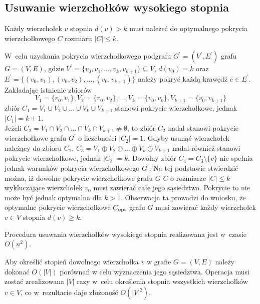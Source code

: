 \subsection{Usuwanie wierzchołków wysokiego stopnia}\label{section_kernelization_high-degree}

\begin{theorem}
  Każdy wierzchołek $v$ stopnia $d(v) > k$ musi należeć do optymalnego pokrycia wierzchołkowego 
  $C$ rozmiaru $|C| \leq k$.
\end{theorem}
\begin{bproof}
  W~celu uzyskania pokrycia wierzchołkowego podgrafu $G^\prime=(V^\prime,E^\prime)$
  grafu $G=(V,E)$, gdzie $V^\prime=\{v_0, v_1, \ldots, v_k, v_{k+1}\} \subseteq V$, $d(v_0)=k$ oraz \\
  $E^\prime=\{(v_0,v_1), (v_0,v_2), \ldots, (v_0,v_{k+1})\}$ należy pokryć każdą krawędź $e \in E^\prime$.
  Zakładając istnienie zbiorów \[V_1=\{v_0,v_1\}, V_2=\{v_0,v_2\}, \ldots,
  V_k=\{v_0,v_k\},V_{k+1}=\{v_0,v_{k+1}\}\]
  zbiór $C_1=V_1 \cup V_2 \cup \ldots \cup V_k \cup V_{k+1}$ stanowi pokrycie wierzchołkowe, jednak $|C_1| = k +1$.\\
  Jeżeli $C_2=V_1 \cap V_2 \cap \ldots \cap V_k \cap V_{k+1} \neq \emptyset$, to zbiór $C_2$ nadal stanowi pokrycie wierzchołkowe grafu $G^\prime$ o liczebności
  $|C_2|=1$.
  Gdyby usunąć wierzchołek należący do zbioru $C_2$, $C_3=V_1 \oplus V_2 \oplus \ldots \oplus V_k \oplus V_{k+1}$ nadal
  również stanowi pokrycie wierzchołkowe, jednak $|C_3|=k$.
  Dowolny zbiór $C_4=C_3 \setminus \{v\}$ nie spełnia jednak warunków pokrycia wierzchołkowego $G^\prime$.
  Na tej podstawie stwierdzić można, iż dowolne pokrycie wierzchołkowe grafu $G$ 
  $C$ o rozmiarze $|C| \leq k$ wykluczające wierzchołek $v_0$ musi zawierać całe jego
  sąsiedztwo. Pokrycie to nie może być jednak optymalna dla $k > 1$.
  Obserwacja ta prowadzi do wniosku, że optymalne pokrycie wierzchołkowe
  $C_{\textnormal{opt}}$ grafu $G$ musi zawierać każdy wierzchołek $v \in V$ stopnia $d(v) \geq k$.
\end{bproof}

\begin{theorem}
  Procedura usuwania wierzchołków wysokiego stopnia realizowana jest w~czasie $O(n^2)$.
\end{theorem}
\begin{bproof}
  Aby określić stopień dowolnego wierzchołka $v$ w grafie $G=(V,E)$ należy 
  dokonać $O(|V|)$ porównań w celu wyznaczenia jego sąsiedztwa.
  Operacja musi zostać zrealizowana $|V|$ razy w~celu określenia stopnia
  wszystkich wierzchołków $v \in V$, co w~rezultacie daje złożoność $O (|V|^2)$.
\end{bproof}

